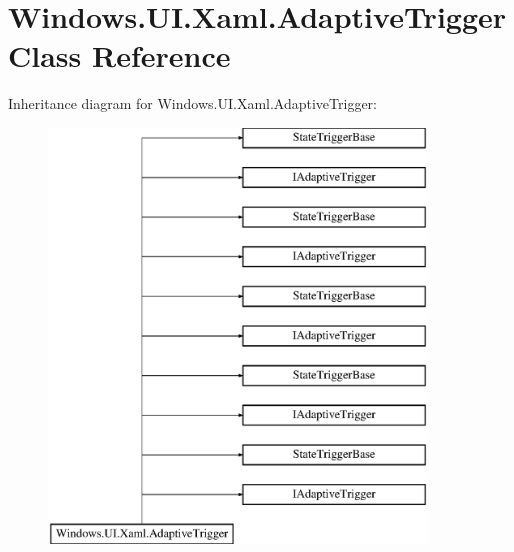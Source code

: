 \hypertarget{class_windows_1_1_u_i_1_1_xaml_1_1_adaptive_trigger}{}\section{Windows.\+U\+I.\+Xaml.\+Adaptive\+Trigger Class Reference}
\label{class_windows_1_1_u_i_1_1_xaml_1_1_adaptive_trigger}
Inheritance diagram for Windows.\+U\+I.\+Xaml.\+Adaptive\+Trigger\+:\begin{figure}[H]
\begin{center}
\leavevmode
\includegraphics[height=11.000000cm]{class_windows_1_1_u_i_1_1_xaml_1_1_adaptive_trigger}
\end{center}
\end{figure}
